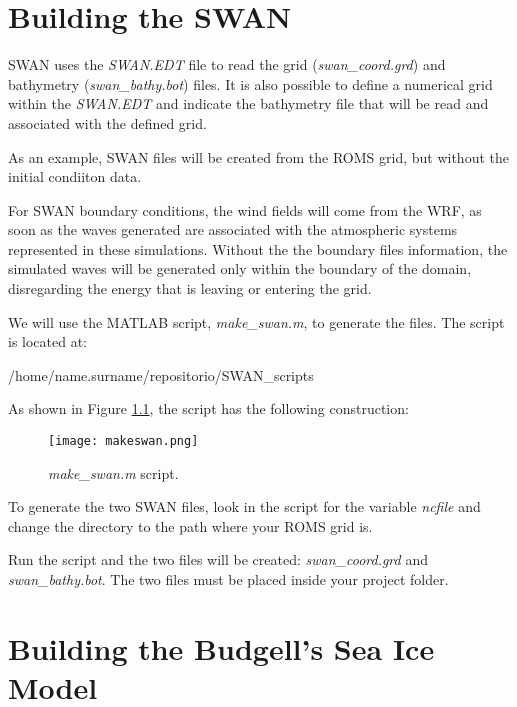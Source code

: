 \bigskip
\chapter{Building the SWAN}

\noindent SWAN uses the \textit{SWAN.EDT} file to read the grid (\textit{swan\_coord.grd}) and bathymetry (\textit{swan\_bathy.bot}) files. 
It is also possible to define a numerical grid within the \textit{SWAN.EDT} and indicate the bathymetry file that will be read and associated 
with the defined grid.
\bigskip

\noindent As an example, SWAN files will be created from the ROMS grid, but without the initial condiiton data.
\bigskip

\noindent For SWAN boundary conditions, the wind fields will come from the WRF, as soon as
the waves generated are associated with the atmospheric systems represented in these simulations. Without the
the boundary files information, the simulated waves will be generated only within the boundary of the domain, disregarding the energy that
is leaving or entering the grid.
\bigskip

\noindent We will use the MATLAB script, \textit{make\_swan.m}, to generate the files. The script is located at:
\bigskip

\begin{bashcode}
/home/name.surname/repositorio/SWAN_scripts
\end{bashcode}
\bigskip

\noindent As shown in Figure \textcolor{bleu_cite}{\ref{makeswan}}, the script has the following construction:
\bigskip

\begin{figure}[H]
    \centering
    \texttt{[image: makeswan.png]}
    \caption{\textit{make\_swan.m} script.}
    \label{makeswan}
\end{figure}
\bigskip

\noindent To generate the two SWAN files, look in the script for the variable \textit{ncfile} and change the directory
to the path where your ROMS grid is.
\bigskip

\noindent Run the script and the two files will be created: \textit{swan\_coord.grd} and \textit{swan\_bathy.bot}.
The two files must be placed inside your project folder.
\bigskip

\chapter{Building the Budgell's Sea Ice Model}
\bigskip

